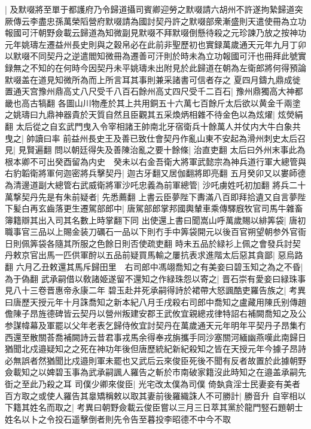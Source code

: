 |{
	及默啜將至單于都護府乃令歸道攝司賓卿迎勞之默啜請六胡州不許遂拘縶歸道突厥傳云李盡忠孫萬榮䧟營府默啜請為國討契丹許之默啜部衆漸盛則天遣使冊為立功報國可汗朝野僉載云歸道為知微副見默啜不拜默啜倒懸待殺之元珍諫乃放之按神功元年姚璹左遷益州長史則與之穀帛必在此前非聖歷初也實録萬歲通天元年九月丁卯以默啜不同契丹之逆遣閻知微冊為遷善可汗則於時未為立功報國可汗也冊拜此號實録無之不知的在何時今因契丹未平姚璹未出附見於此歸道在朝為左衛郎將何得預論默啜盖在道見知微所為而上所言耳其事則兼采諸書可信者存之}
夏四月鑄九鼎成徙置通天宫豫州鼎高丈八尺受千八百石餘州高丈四尺受千二百石|{
	豫州鼎獨高大神都畿也高古犒翻}
各圖山川物產於其上共用銅五十六萬七百餘斤太后欲以黄金千兩塗之姚璹曰九鼎神器貴於天質自然且臣觀其五采煥炳相雜不待金色以為炫燿|{
	炫熒絹翻}
太后從之自玄武門曳入令宰相諸王帥南北牙宿衛兵十餘萬人并仗内大牛白象共曳之|{
	帥讀曰率}
前益州長史王及善已致仕會契丹作亂山東不安起為滑州刺史太后召見|{
	見賢遍翻}
問以朝廷得失及善陳治亂之要十餘條|{
	治直吏翻}
太后曰外州末事此為根本卿不可出癸酉留為内史　癸未以右金吾衛大將軍武懿宗為神兵道行軍大總管與右豹韜衛將軍何迦密將兵擊契丹|{
	迦古牙翻又居伽翻將即亮翻}
五月癸卯又以婁師德為清邊道副大總管右武威衛將軍沙吒忠義為前軍總管|{
	沙吒虜姓吒初加翻}
將兵二十萬撃契丹先是有朱前疑者|{
	先悉薦翻}
上書云臣夢陛下夀滿八百即拜拾遺又自言夢陛下髪白再玄齒落更生遷駕部郎中|{
	唐駕部郎掌邦國輿輦車乘傳驛廐牧官司馬牛雜畜簿籍辯其出入司其名數上時掌翻下同}
出使還上書曰聞嵩山呼萬歲賜以緋筭袋|{
	唐初職事官三品以上賜金装刀礪石一品以下則冇手中筭袋開元以後百官朔望朝参外官衙日則佩筭袋各隨其所服之色餘日則否使疏吏翻}
時未五品於緑衫上佩之會發兵討契丹敕京官出馬一匹供軍酧以五品前疑買馬輸之屢抗表求進階太后惡其貪鄙|{
	惡烏路翻}
六月乙丑敕還其馬斥歸田里　右司郎中馮翊喬知之有美妾曰碧玉知之為之不昏|{
	為于偽翻}
武承嗣借以敎諸姫遂留不還知之作緑珠怨以寄之|{
	晋石崇有愛妾曰緑珠事見八十三卷晋惠帝永康二年}
碧玉赴井死承嗣得詩於裙帶大怒諷酷吏羅告族之|{
	考異曰唐歷天授元年十月誅喬知之新本紀八月壬戌殺右司郎中喬知之盧藏用陳氏别傳趙儋陳子昂旌德碑皆云契丹以營州叛建安郡王武攸宜親總戎律特詔右補闕喬知之及公参謀幃幕及軍罷以父年老表乞歸侍攸宜討契丹在萬歲通天元年明年平契丹子昂集冇西還至散關荅喬補闕詩云昔君事戎馬余得奉戎旃攜手同沙塞關河緬幽燕嘆此南歸日猶聞北戍邉疑知之之死在神功年後但唐歷統紀新紀殺知之皆在天授元年今據子昂詩必無誤者然猶聞比戍邉則軍未罷也又武后云來俊臣死後不聞有反者故置於此據朝野僉載知之以婢碧玉事為武承嗣諷人羅告之斬於市南破家籍沒此時知之在邉盖承嗣先衘之至此乃殺之耳}
司僕少卿來俊臣|{
	光宅改太僕為司僕}
倚埶貪淫士民妻妾有美者百方取之或使人羅告其辠矯稱敕以取其妻前後羅織誅人不可勝計|{
	勝音升}
自宰相以下籍其姓名而取之|{
	考異曰朝野僉載云俊臣嘗以三月三日萃其黨於龍門竪石題朝士姓名以卜之令投石遥擊倒者則先令告至暮投李昭德不中今不取}
